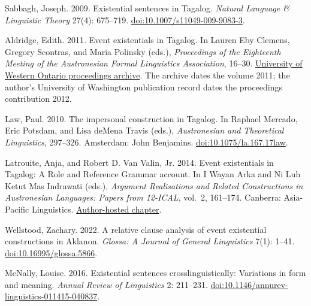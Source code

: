 Sabbagh, Joseph. 2009.
Existential sentences in Tagalog.
\textit{Natural Language \& Linguistic Theory} 27(4): 675--719.
\href{https://doi.org/10.1007/s11049-009-9083-3}{doi:10.1007/s11049-009-9083-3}.

Aldridge, Edith. 2011.
Event existentials in Tagalog.
In Lauren Eby Clemens, Gregory Scontras, and Maria Polinsky (eds.),
\textit{Proceedings of the Eighteenth Meeting of the Austronesian Formal
Linguistics Association}, 16--30.
\href{https://ojs.lib.uwo.ca/index.php/afla/issue/view/2037}{University of Western Ontario proceedings archive}.
The archive dates the volume 2011; the author's University of Washington
publication record dates the proceedings contribution 2012.

Law, Paul. 2010.
The impersonal construction in Tagalog.
In Raphael Mercado, Eric Potsdam, and Lisa deMena Travis (eds.),
\textit{Austronesian and Theoretical Linguistics}, 297--326.
Amsterdam: John Benjamins.
\href{https://doi.org/10.1075/la.167.17law}{doi:10.1075/la.167.17law}.

Latrouite, Anja, and Robert D. Van Valin, Jr. 2014.
Event existentials in Tagalog: A Role and Reference Grammar account.
In I Wayan Arka and Ni Luh Ketut Mas Indrawati (eds.),
\textit{Argument Realisations and Related Constructions in Austronesian
Languages: Papers from 12-ICAL}, vol.~2, 161--174.
Canberra: Asia-Pacific Linguistics.
\href{https://rrg.caset.buffalo.edu/rrg/vanvalin_papers/Lat_Valin.pdf}{Author-hosted chapter}.

Wellstood, Zachary. 2022.
A relative clause analysis of event existential constructions in Aklanon.
\textit{Glossa: A Journal of General Linguistics} 7(1): 1--41.
\href{https://doi.org/10.16995/glossa.5866}{doi:10.16995/glossa.5866}.

McNally, Louise. 2016.
Existential sentences crosslinguistically: Variations in form and meaning.
\textit{Annual Review of Linguistics} 2: 211--231.
\href{https://doi.org/10.1146/annurev-linguistics-011415-040837}{doi:10.1146/annurev-linguistics-011415-040837}.

